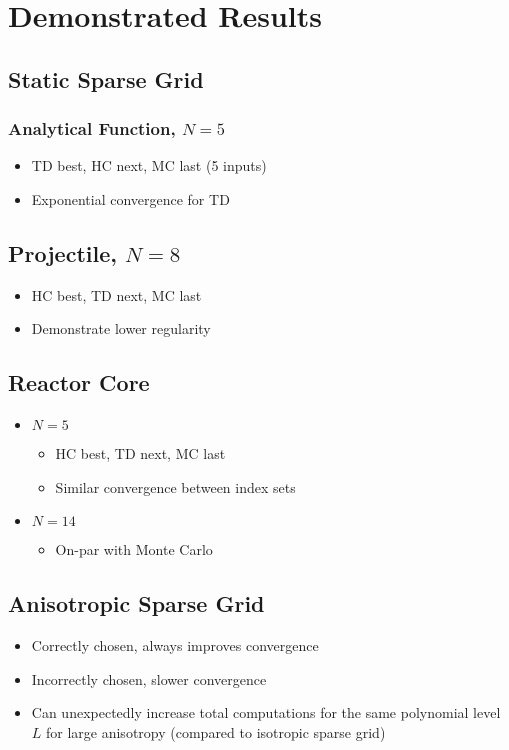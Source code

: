 \documentclass{article}
\begin{document}
\section{Demonstrated Results}
\subsection{Static Sparse Grid}
\subsubsection{Analytical Function, $N=5$}
  \begin{itemize}
  \item TD best, HC next, MC last (5 inputs)
  \item Exponential convergence for TD
  \end{itemize}
\subsection{Projectile, $N=8$}
  \begin{itemize}
  \item HC best, TD next, MC last
  \item Demonstrate lower regularity
  \end{itemize}
\subsection{Reactor Core}
  \begin{itemize}
  \item $N=5$
    \begin{itemize}
    \item HC best, TD next, MC last
    \item Similar convergence between index sets
    \end{itemize}
  \item $N=14$
    \begin{itemize}
    \item On-par with Monte Carlo
    \end{itemize}
  \end{itemize}
\subsection{Anisotropic Sparse Grid}
  \begin{itemize}
  \item Correctly chosen, always improves convergence
  \item Incorrectly chosen, slower convergence
  \item Can unexpectedly increase total computations for the same polynomial level $L$ for large anisotropy (compared to isotropic sparse grid)
  \end{itemize}
\end{document}
